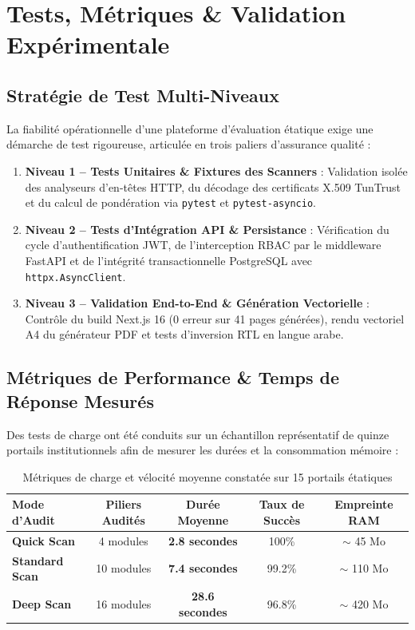 \chapter[Tests \& Validation Expérimentale]{Tests, Métriques \& Validation Expérimentale}
\label{chap:tests}

\section{Stratégie de Test Multi-Niveaux}
La fiabilité opérationnelle d'une plateforme d'évaluation étatique exige une démarche de test rigoureuse, articulée en trois paliers d'assurance qualité :
\begin{enumerate}
    \item \textbf{Niveau 1 -- Tests Unitaires \& Fixtures des Scanners} : Validation isolée des analyseurs d'en-têtes HTTP, du décodage des certificats X.509 TunTrust et du calcul de pondération via \texttt{pytest} et \texttt{pytest-asyncio}.
    \item \textbf{Niveau 2 -- Tests d'Intégration API \& Persistance} : Vérification du cycle d'authentification JWT, de l'interception RBAC par le middleware FastAPI et de l'intégrité transactionnelle PostgreSQL avec \texttt{httpx.AsyncClient}.
    \item \textbf{Niveau 3 -- Validation End-to-End \& Génération Vectorielle} : Contrôle du build Next.js 16 (0 erreur sur 41 pages générées), rendu vectoriel A4 du générateur PDF et tests d'inversion RTL en langue arabe.
\end{enumerate}

\section{Métriques de Performance \& Temps de Réponse Mesurés}
Des tests de charge ont été conduits sur un échantillon représentatif de quinze portails institutionnels afin de mesurer les durées et la consommation mémoire :

\begin{table}[!htbp]
\centering
\caption{Métriques de charge et vélocité moyenne constatée sur 15 portails étatiques}
\label{tab:perf_metrics}
\begin{singlespace}
\footnotesize
\renewcommand{\arraystretch}{1.1}
\begin{tabularx}{\textwidth}{l c c c c}
\toprule
\textbf{Mode d'Audit} & \textbf{Piliers Audités} & \textbf{Durée Moyenne} & \textbf{Taux de Succès} & \textbf{Empreinte RAM} \\
\midrule
\textbf{Quick Scan} & 4 modules & \textbf{2.8 secondes} & 100\% & $\sim$ 45 Mo \\
\textbf{Standard Scan} & 10 modules & \textbf{7.4 secondes} & 99.2\% & $\sim$ 110 Mo \\
\textbf{Deep Scan} & 16 modules & \textbf{28.6 secondes} & 96.8\% & $\sim$ 420 Mo \\
\bottomrule
\end{tabularx}
\end{singlespace}
\end{table}

